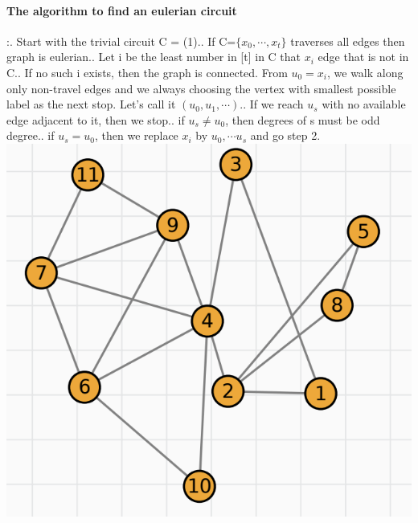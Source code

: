 \documentclass{article}
\begin{document}
\paragraph{The algorithm to find an eulerian circuit}:. Start with the trivial circuit C = (1).. If C=$\{x_0,\cdots,x_t\}$ traverses all edges then graph is eulerian.. Let i be the least number in [t] in C that $x_i$ edge that is not in C.. If no such i exists, then the graph is connected. From $u_0=x_i$, we walk along only non-travel edges and we always choosing the vertex with smallest possible label as the next stop. Let's call it $(u_0,u_1,\cdots)$.. If we reach $u_s$ with no available edge adjacent to it, then we stop.. if $u_s \neq u_0$, then degrees of s must be odd degree.. if $u_s=u_0$, then we replace $x_i$ by $u_0,\cdots u_s$ and go step 2.\newline
\includegraphics{0067}
\end{document}
